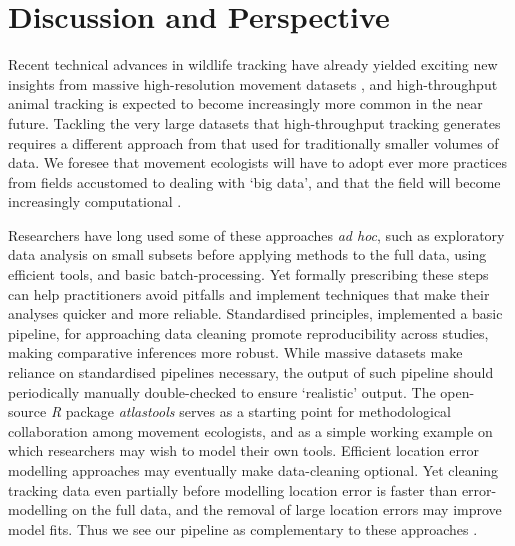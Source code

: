     \section*{Discussion and Perspective}

    Recent technical advances in wildlife tracking have already yielded exciting new insights from massive high-resolution movement datasets \citep{aspillaga2021, aspillaga2021a, baktoft2017, baktoft2019, harel2016, harel2018, oudman2018, papageorgiou2019, tsoar2011, strandburg-peshkin2015, toledo2020, beardsworth2021a, beardsworth2021b, corl2020, vilk2021, lourie2021}, and high-throughput animal tracking is expected to become increasingly more common in the near future.
    Tackling the very large datasets that high-throughput tracking generates requires a different approach from that used for traditionally smaller volumes of data.
    We foresee that movement ecologists will have to adopt ever more practices from fields accustomed to dealing with `big data', and that the field will become increasingly computational \citep{peng2011}.

    Researchers have long used some of these approaches \textit{ad hoc}, such as exploratory data analysis on small subsets before applying methods to the full data, using efficient tools, and basic batch-processing. 
    Yet formally prescribing these steps can help practitioners avoid pitfalls and implement techniques that make their analyses quicker and more reliable.
    Standardised principles, implemented a basic pipeline, for approaching data cleaning promote reproducibility across studies, making comparative inferences more robust.
    While massive datasets make reliance on standardised pipelines necessary, the output of such pipeline should periodically manually double-checked to ensure `realistic' output.
    The open-source \textit{R} package \textit{atlastools} serves as a starting point for methodological collaboration among movement ecologists, and as a simple working example on which researchers may wish to model their own tools.
    Efficient location error modelling approaches \citep{fleming2020, aspillaga2021} may eventually make data-cleaning optional.
    Yet cleaning tracking data even partially before modelling location error is faster than error-modelling on the full data, and the removal of large location errors may improve model fits.
    Thus we see our pipeline as complementary to these approaches \citep{fleming2014, fleming2020}.

